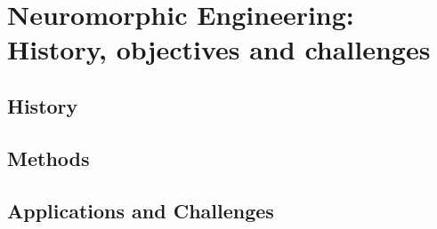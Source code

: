 \documentclass[main]{subfiles}
\begin{document}
\newpage
\section{Neuromorphic Engineering: History, objectives and challenges}
\subsection{History}
\subsection{Methods}
\subsection{Applications and Challenges}
\end{document}

